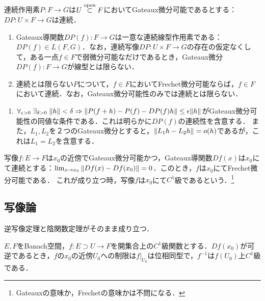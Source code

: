 \documentclass[uplatex,dvipdfmx]{jsreport}
\begin{document}
\begin{lemma}
    連続作用素$P:F\to G$は$U\overset{\mathrm{open}}{\subset} F$においてGateaux微分可能であるとする：$DP:U\times F\to G$は連続．
    \begin{enumerate}
        \item Gateaux導関数$DP(f):F\to G$は一意な連続線型作用素である：$DP(f)\in L(F,G)$．なお，連続写像$DP:U\times F\to G$の存在の仮定なくして，ある一点$f\in F$で弱微分可能なだけであるとき，Gateaux微分$DP(f):F\to G$が線型とは限らない．
        \item 連続とは限らない$P$について，$f\in F$においてFrechet微分可能ならば，$f\in F$において連続．なお，Gateaux微分可能性のみでは連続とは限らない．
    \end{enumerate}
\end{lemma}
\begin{Proof}\mbox{}
    \begin{enumerate}
        \item 
        $\forall_{\epsilon>0}\;\exists_{\delta>0}\;\|h\|<\delta\Rightarrow\|P(f+h)-P(f)-DP(f)h\|\le\epsilon\|h\|$がGateaux微分可能性の同値な条件である．これは明らかに$DP(f)$の連続性を含意する．
        また，$L_1,L_2$を２つのGateaux微分とすると，$\|L_1h-L_2h\|=o(h)$であるが，これは$L_1=L_2$を含意する．
    \end{enumerate}
\end{Proof}

\begin{theorem}[$C^1$級]
    写像$f:E\to F$は$x_0$の近傍でGateaux微分可能かつ，Gateaux導関数$Df(x)$は$x_0$にて連続とする：$\lim_{x\to x_0}\|Df(x)-Df(x_0)\|=0$．このとき，$f$は$x_0$にてFrechet微分可能である．
    これが成り立つ時，写像$f$は$x_0$にて$C^1$級であるという．\footnote{Gateauxの意味か，Frechetの意味かは不問になる．}
\end{theorem}

\subsection{写像論}

\begin{tcolorbox}[colframe=ForestGreen, colback=ForestGreen!10!white,breakable,colbacktitle=ForestGreen!40!white,coltitle=black,fonttitle=\bfseries\sffamily,
title=]
    逆写像定理と陰関数定理がそのまま成り立つ．
\end{tcolorbox}

\begin{theorem}
    $E,F$をBanach空間，$f:E\supset U\to F$を開集合上の$C^1$級関数とする．$Df(x_0)$が可逆であるとき，$f$の$x_0$の近傍$U_0$への制限は$f|_{U_0}$は位相同型で，$f^{-1}$は$f(U_0)$上$C^1$級である．
\end{theorem}
\end{document}
